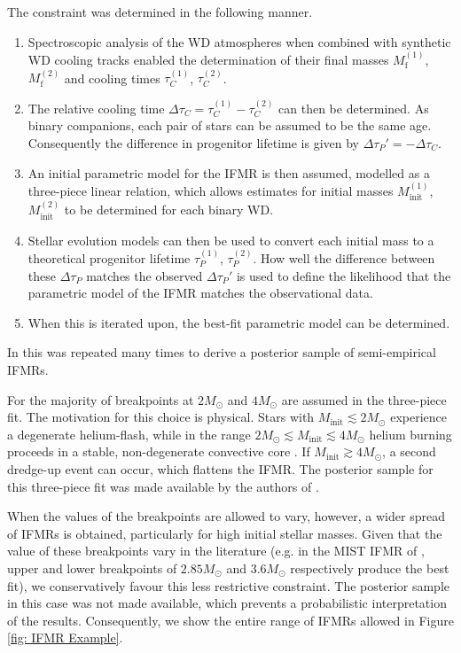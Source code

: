 The constraint \cite{Andrews} was determined in the following manner.
\begin{enumerate}
    \item Spectroscopic analysis of the WD atmospheres when combined with synthetic WD cooling tracks enabled the determination of their final masses $M_{\mathrm{f}}^{(1)}$, $M_{\mathrm{f}}^{(2)}$ and cooling times $\tau_{C}^{(1)}$, $\tau_{C}^{(2)}$.
    \item The relative cooling time $\Delta\tau_{C}=\tau_{C}^{(1)}-\tau_{C}^{(2)}$ can then be determined. As binary companions, each pair of stars can be assumed to be the same age. Consequently the difference in progenitor lifetime is given by $\Delta\tau_P'=-\Delta\tau_C$.
    \item An initial parametric model for the IFMR is then assumed, modelled as a three-piece linear relation, which allows estimates for initial masses $M_{\mathrm{init}}^{(1)}$, $M_{\mathrm{init}}^{(2)}$ to be determined for each binary WD.
    \item Stellar evolution models can then be used to convert each initial mass to a theoretical progenitor lifetime $\tau_{P}^{(1)}$, $\tau_{P}^{(2)}$. How well the difference between these $\Delta\tau_P$ matches the observed $\Delta\tau_P'$ is used to define the likelihood that the parametric model of the IFMR matches the observational data.
    \item When this is iterated upon, the best-fit parametric model can be determined.
\end{enumerate}
In \cite{Andrews} this was repeated many times to derive a posterior sample of semi-empirical IFMRs.

For the majority of \cite{Andrews} breakpoints at $2M_{\odot}$ and $4M_{\odot}$ are assumed in the three-piece fit. The motivation for this choice is physical. Stars with $M_{\mathrm{init}}\lesssim2M_{\odot}$ experience a degenerate helium-flash, while in the range $2M_{\odot}\lesssim M_{\mathrm{init}}\lesssim4M_{\odot}$ helium burning proceeds in a stable, non-degenerate convective core \cite{1976ApJS...32..367S}. If $M_{\mathrm{init}}\gtrsim4M_{\odot}$, a second dredge-up event can occur, which flattens the IFMR. The posterior sample for this three-piece fit  was made available by the authors of \cite{Andrews}.

When the values of the breakpoints are allowed to vary, however, a wider spread of IFMRs is obtained, particularly for high initial stellar masses. Given that the value of these breakpoints vary in the literature (e.g. in the MIST IFMR of \cite{Cummings_2018}, upper and lower breakpoints of $2.85M_{\odot}$ and $3.6M_{\odot}$ respectively produce the best fit), we conservatively favour this less restrictive constraint. The posterior sample in this case was not made available, which prevents a probabilistic interpretation of the results. Consequently, we show the entire range of IFMRs allowed in Figure \ref{fig: IFMR Example}.


